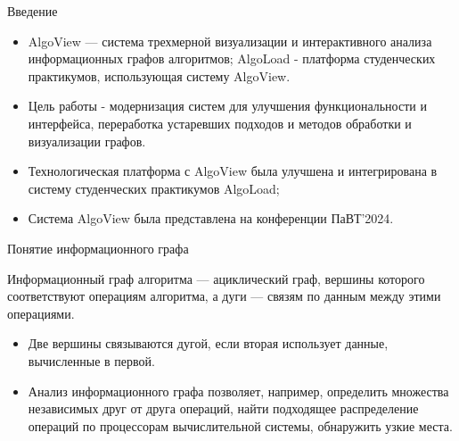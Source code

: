 \begin{frame}{Введение}
\begin{itemize}

    \item AlgoView — система трехмерной визуализации и интерактивного анализа информационных графов алгоритмов; AlgoLoad - платформа студенческих практикумов, использующая систему AlgoView.
    \item Цель работы - модернизация систем для улучшения функциональности и интерфейса, переработка устаревших подходов и методов обработки и визуализации графов.
    \item Технологическая платформа с AlgoView была улучшена и интегрирована в систему студенческих практикумов AlgoLoad;
    \item Система AlgoView была представлена на конференции ПаВТ'2024.
    
\end{itemize}
\end{frame}


\begin{frame}{Понятие информационного графа}

Информационный граф алгоритма — ациклический граф, вершины которого соответствуют операциям алгоритма, а дуги — связям по данным между этими операциями.  
 
\begin{itemize}
    \item Две вершины связываются дугой, если вторая использует данные, вычисленные в первой.
    \item Анализ информационного графа позволяет, например, определить множества независимых друг от друга операций, найти подходящее распределение операций по процессорам вычислительной системы, обнаружить узкие места.
\end{itemize}






    
\end{frame}

